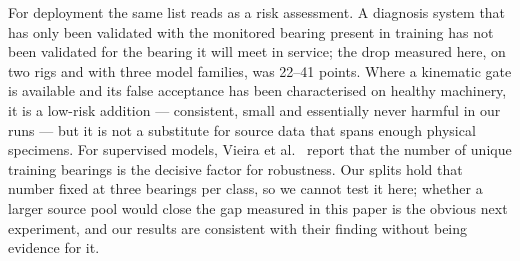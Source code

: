 For deployment the same list reads as a risk assessment. A diagnosis system that has only been validated with the monitored
bearing present in training has not been validated for the bearing it will meet in service; the drop measured here, on two
rigs and with three model families, was 22--41 points. Where a kinematic gate is available and its false acceptance has been
characterised on healthy machinery, it is a low-risk addition --- consistent, small and essentially never harmful in our
runs --- but it is not a substitute for source data that spans enough physical specimens. For supervised models, Vieira et al.\ \cite{vieira2026} report that the number
of unique training bearings is the decisive factor for robustness. Our splits hold that number fixed at three bearings per
class, so we cannot test it here; whether a larger source pool would close the gap measured in this paper is the obvious
next experiment, and our results are consistent with their finding without being evidence for it.
